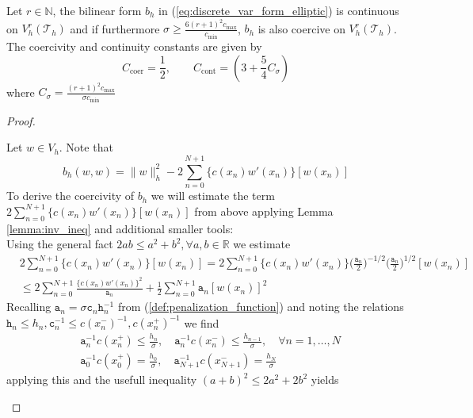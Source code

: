 \begin{theorem}
	\label{thr:cont_coerc_bilin_form}
	Let $r\in \mathbb{N}$, the bilinear form $b_h$ in (\ref{eq:discrete_var_form_elliptic}) is continuous
	on $V_h^r(\mathcal{T}_h)$ and if furthermore $\sigma \geq \frac{6 (r+1)^2 c_{\max} }{c_{\min}}$, $b_h$ is also
	coercive on $V_h^r(\mathcal{T}_h)$. 
	The coercivity and continuity constants are given by 
	\begin{equation*}
		C_{\text{coer}} = \frac{1}{2}, \qquad C_{\text{cont}} = (3 + \frac{5}{4} C_{\sigma}) 
	\end{equation*}
	where $C_{\sigma} = \frac{(r+1)^2 c_{\max} }{\sigma c_{\min}}$
\end{theorem}
\begin{proof}
	\begin{proofstep}[Coercivity]
		Let $w\in V_h$. Note that
		\begin{equation}
			\label{eq:coerc_thr_relation_bilin_form_with_norm}
			b_h(w,w) = \|w\|_h^2 - 2\sum_{n=0}^{N+1}\{c(x_n)w'(x_n)\}[w(x_n)]
		\end{equation}
		To derive the coercivity of $b_h$ we will estimate the term $2\sum_{n=0}^{N+1}\{c(x_n)w'(x_n)\}[w(x_n)]$
		from above applying Lemma \ref{lemma:inv_ineq} and additional smaller tools:\\
		Using the general fact $2ab \leq a^2 + b^2, \forall a,b\in\mathbb{R}$ we estimate
		\begin{align}
			 & 2\sum_{n=0}^{N+1}\{c(x_n)w'(x_n)\}[w(x_n)] = 2\sum_{n=0}^{N+1}\{c(x_n)w'(x_n)\}
			\Big(\frac{\texttt{a}_n}{2}\Big)^{-1/2} \Big(\frac{\texttt{a}_n}{2}\Big)^{1/2} [w(x_n)]\nonumber \\
			 & \leq 2\sum_{n=0}^{N+1} \frac{\{c(x_n)w'(x_n)\}^2}{\texttt{a}_n}
			+ \frac{1}{2} \sum_{n=0}^{N+1} \texttt{a}_n [w(x_n)]^2 \label{eq:2_coerc_thr_first_estimate}
		\end{align}
		Recalling $\texttt{a}_n = \sigma \texttt{c}_n\texttt{h}_n^{-1}$ from (\ref{def:penalization_function}) and noting the relations
		$\texttt{h}_n \leq h_n, \texttt{c}_n^{-1} \leq c(x_n^-)^{-1}, c(x_n^+)^{-1}$ we find
		\begin{align*}
			 & \texttt{a}_n^{-1} c(x_n^+) \leq \frac{h_n}{\sigma}, \quad \texttt{a}_n^{-1} c(x_n^-) \leq \frac{h_{n-1}}{\sigma}, \quad \forall n=1,\ldots,N \\
			 & \texttt{a}_0^{-1} c(x_0^+) = \frac{h_0}{\sigma} , \quad \texttt{a}_{N+1}^{-1} c(x_{N+1}^-) = \frac{h_{N}}{\sigma}
		\end{align*}
		applying this and the usefull inequality $(a+b)^2 \leq 2a^2 + 2b^2$ yields

\end{proofstep}
\end{proof}
